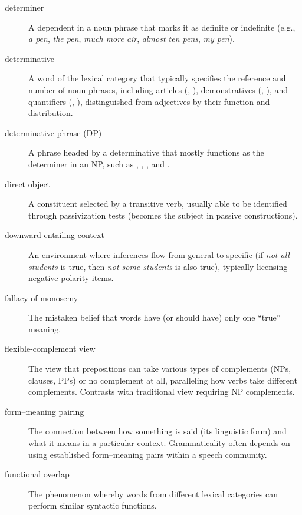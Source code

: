 \begin{description}
\item[determiner] A dependent in a noun phrase that marks it as definite or indefinite (e.g., \textit{\emph{a} pen}, \textit{\emph{the} pen}, \textit{\emph{much more} air}, \textit{\emph{almost ten} pens}, \textit{\emph{my} pen}).

\item[determinative] A word of the lexical category that typically specifies the reference and number of noun phrases, including articles (, ), demonstratives (, ), and quantifiers (, ), distinguished from adjectives by their function and distribution.

\item[determinative phrase (DP)] A phrase headed by a determinative that mostly functions as the determiner in an NP, such as , , , and .

\item[direct object] A constituent selected by a transitive verb, usually able to be identified through passivization tests (becomes the subject in passive constructions).

\item[downward-entailing context] An environment where inferences flow from general to specific (if \emph{not all students} is true, then \emph{not some students} is also true), typically licensing negative polarity items.

\item[fallacy of monosemy] The mistaken belief that words have (or should have) only one ``true'' meaning.

\item[flexible-complement view] The view that prepositions can take various types of complements (NPs, clauses, PPs) or no complement at all, paralleling how verbs take different complements. Contrasts with traditional view requiring NP complements.

\item[form--meaning pairing] The connection between how something is said (its linguistic form) and what it means in a particular context. Grammaticality often depends on using established form--meaning pairs within a speech community.

\item[functional overlap] The phenomenon whereby words from different lexical categories can perform similar syntactic functions.


\end{description}
